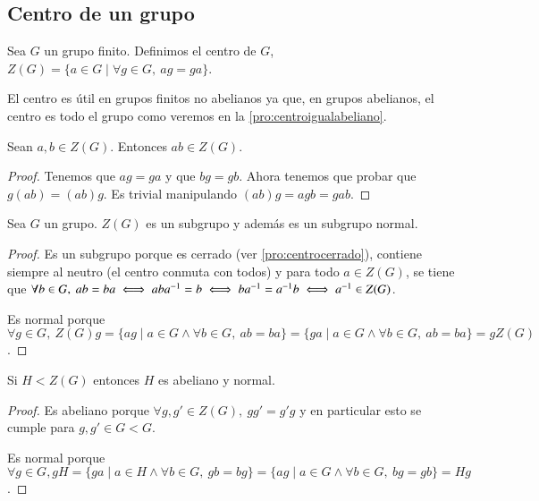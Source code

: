 

\subsection{Centro de un grupo}

\begin{dfn}
	\label{dfn:centro}
	Sea $G$ un grupo finito. Definimos el centro de $G$, $Z(G) = \{a \in G \mid \forall g \in G,\ ag = ga\}$.
\end{dfn}

El centro es útil en grupos finitos no abelianos ya que, en grupos abelianos, el centro es todo el grupo como veremos en la 
\autoref{pro:centroigualabeliano}.

\begin{pro}
	\label{pro:centrocerrado}
	Sean $a, b \in Z(G)$. Entonces $ab \in Z(G)$.
\end{pro}

\begin{proof}
	Tenemos que $ag = ga$ y que $bg = gb$. Ahora tenemos que probar que $g(ab) = (ab)g$. Es trivial manipulando $(ab)g = agb = gab$.
\end{proof}

\begin{pro}
	\label{pro:centronormal}
	Sea $G$ un grupo. $Z(G)$ es un subgrupo y además es un subgrupo normal.
\end{pro}

\begin{proof}
	Es un subgrupo porque es cerrado (ver \autoref{pro:centrocerrado}), contiene siempre al neutro (el centro conmuta con todos) y para todo $a \in Z(G)$, se tiene que $\forall b \in G,\ ab = ba \iff aba^{-1} = b \iff ba^{-1} = a^{-1}b \iff a^{-1} \in Z(G)$.
	
	Es normal porque $\forall g \in G,\ Z(G)g = \{ag \mid a \in G \land \forall b \in G,\ ab = ba\} = \{ga \mid a \in G \land \forall b \in G,\ ab = ba\} = gZ(G)$.
\end{proof}

\begin{pro}
	\label{pro:subcentronormal}
	Si $H < Z(G)$ entonces $H$ es abeliano y normal.
\end{pro}

\begin{proof}
	Es abeliano porque $\forall g,g' \in Z(G),\ gg' = g'g$ y en particular esto se cumple para $g,g' \in G < G$.
	
	Es normal porque $\forall g \in G, gH = \{ga \mid a \in H \land \forall b \in G,\ gb = bg\} = \{ag \mid a \in G \land \forall b \in G,\ bg = gb\} = Hg$.
\end{proof}


